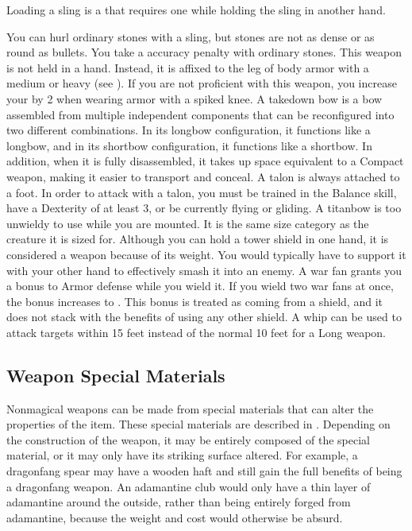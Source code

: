      Loading a sling is a  that requires one  while holding the sling in another hand.
    \par You can hurl ordinary stones with a sling, but stones are not as dense or as round as bullets. You take a  accuracy penalty with ordinary stones.
     This weapon is not held in a hand.
    Instead, it is affixed to the leg of body armor with a medium or heavy  (see ).
    If you are not proficient with this weapon, you increase your  by 2 when wearing armor with a spiked knee.
     A takedown bow is a bow assembled from multiple independent components that can be reconfigured into two different combinations.
    In its longbow configuration, it functions like a longbow, and in its shortbow configuration, it functions like a shortbow.
    In addition, when it is fully disassembled, it takes up space equivalent to a Compact weapon, making it easier to transport and conceal.
     A talon is always attached to a foot.
    In order to attack with a talon, you must be trained in the Balance skill, have a Dexterity of at least 3, or be currently flying or gliding.
     A titanbow is too unwieldy to use while you are mounted.
    It is the same size category as the creature it is sized for.
     Although you can hold a tower shield in one hand, it is considered a  weapon because of its weight.
    You would typically have to support it with your other hand to effectively smash it into an enemy.
     A war fan grants you a  bonus to Armor defense while you wield it.
    If you wield two war fans at once, the bonus increases to .
    This bonus is treated as coming from a shield, and it does not stack with the benefits of using any other shield.
     A whip can be used to attack targets within 15 feet instead of the normal 10 feet for a Long weapon.

  \subsection{Weapon Special Materials}\label{Weapon Special Materials}
    Nonmagical weapons can be made from special materials that can alter the properties of the item.
    These special materials are described in .
    Depending on the construction of the weapon, it may be entirely composed of the special material, or it may only have its striking surface altered.
    For example, a dragonfang spear may have a wooden haft and still gain the full benefits of being a dragonfang weapon.
    An adamantine club would only have a thin layer of adamantine around the outside, rather than being entirely forged from adamantine, because the weight and cost would otherwise be absurd.

